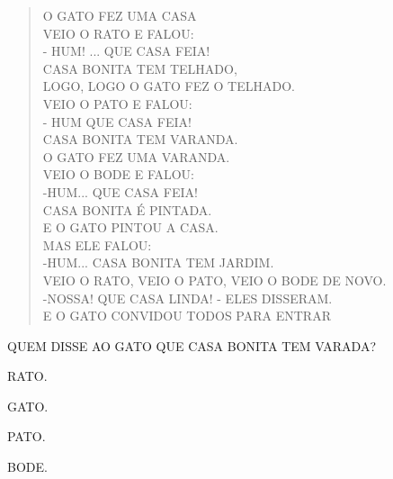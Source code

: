 \begin{escola}
{\begin{verse}
O GATO FEZ UMA CASA\\
VEIO O RATO E FALOU:\\
- HUM! ... QUE CASA FEIA!\\
CASA BONITA TEM TELHADO,\\
LOGO, LOGO O GATO FEZ O TELHADO.\\
VEIO O PATO E FALOU:\\
- HUM QUE CASA FEIA!\\
CASA BONITA TEM VARANDA.\\
O GATO FEZ UMA VARANDA.\\
VEIO O BODE E FALOU:\\
-HUM... QUE CASA FEIA!\\
CASA BONITA É PINTADA.\\
E O GATO PINTOU A CASA.\\
MAS ELE FALOU:\\
-HUM... CASA BONITA TEM JARDIM.\\
VEIO O RATO, VEIO O PATO, VEIO O BODE DE NOVO.\\
-NOSSA! QUE CASA LINDA! - ELES DISSERAM.\\
E O GATO CONVIDOU TODOS PARA ENTRAR
\end{verse}


QUEM DISSE AO GATO QUE CASA BONITA TEM VARADA?

\begin{escolha}
\item RATO.

\item GATO.

\item PATO.

\item BODE.
\end{escolha}

}
\end{escola}
